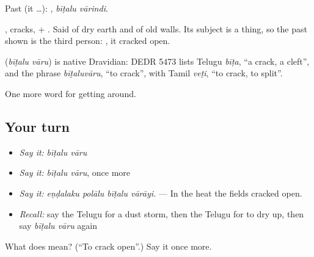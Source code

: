 Past (it …):  , \emph{bīṭalu vārindi}.

, cracks, + . Said of dry earth and of old walls. Its subject is a thing, so the past shown is the third person:  , it cracked open.

\begin{cousinweb}
\textbf{ } (\emph{bīṭalu vāru}) is native Dravidian: DEDR 5473 lists Telugu \emph{bīṭa}, \textquotedblleft{}a crack, a cleft\textquotedblright{}, and the phrase \emph{bīṭaluvāru}, \textquotedblleft{}to crack\textquotedblright{}, with Tamil \emph{veṭi}, \textquotedblleft{}to crack, to split\textquotedblright{}.
\end{cousinweb}

\begin{grammarlens}[title={What you've built}]
One more word for getting around.
\end{grammarlens}

\subsection*{Your turn}
\begin{itemize}
\raggedright
  \item \emph{Say it:} \emph{bīṭalu vāru}
  \item \emph{Say it:} \emph{bīṭalu vāru}, once more
  \item \emph{Say it:} \emph{eṇḍalaku polālu bīṭalu vārāyi.} — In the heat the fields cracked open.
  \item \emph{Recall:} say the Telugu for a dust storm, then the Telugu for to dry up, then say \emph{bīṭalu vāru} again
\end{itemize}

\begin{tcolorbox}[breakable,colback=teal!4,colframe=teal!35!black,title={Before you move on}]
What does   mean? (\textquotedblleft{}To crack open\textquotedblright{}.) Say it once more.
\end{tcolorbox}
